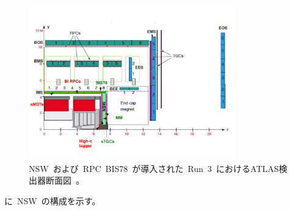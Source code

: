 \begin{figure}[tbp]
        \centering   
        \includegraphics[width=0.8\textwidth,page=1]{img/pdf/ch01_fig_03a.pdf}
        \caption[NSW~および~RPC~BIS78~が導入された~Run~3~におけるATLAS検出器断面図]{NSW~および~RPC~BIS78~が導入された~Run~3~におけるATLAS検出器断面図~\cite{TR:04}。}
        \label{fig:cut3}
\end{figure}
に~NSW~の構成を示す。
